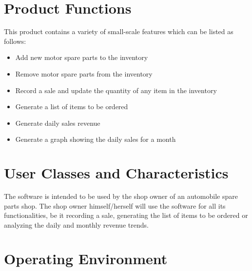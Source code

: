 \documentclass{scrreprt}
\begin{document}
\section{Product Functions}

This product contains a variety of small-scale features which can be listed as follows:
\begin{itemize}
    \item Add new motor spare parts to the inventory
    \item Remove motor spare parts from the inventory
    \item Record a sale and update the quantity of any item in the inventory
    \item Generate a list of items to be ordered
    \item Generate daily sales revenue
    \item Generate a graph showing the daily sales for a month
\end{itemize}


\section{User Classes and Characteristics}

The software is intended to be used by the shop owner of an automobile spare parts shop. The shop owner himself/herself will use the software for all its functionalities, be it recording a sale, generating the list of items to be ordered or analyzing the daily and monthly revenue trends.

\section{Operating Environment}
\end{document}
